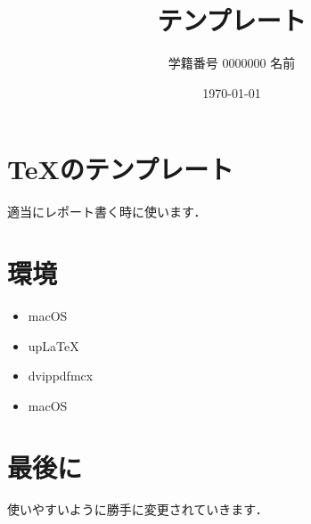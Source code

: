 \documentclass{ujarticle}
\title{テンプレート}
\author{学籍番号 0000000 名前}
\date{\today}
\begin{document}
\maketitle

\section{TeXのテンプレート}
適当にレポート書く時に使います．

\section{環境}
\begin{itemize}
    \item macOS
    \item upLaTeX
    \item dvippdfmcx
    \item macOS
\end{itemize}

\section{最後に}
使いやすいように勝手に変更されていきます．
\end{document}
